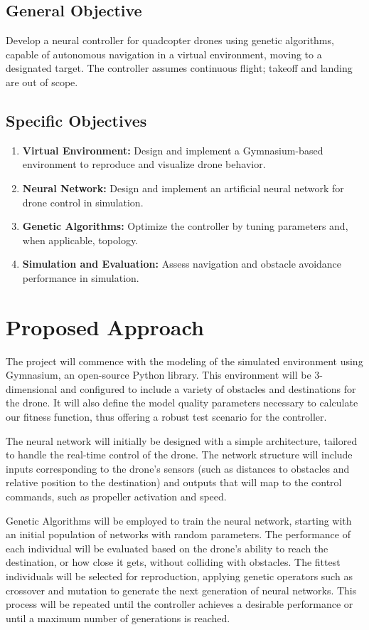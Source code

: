 \documentclass[12pt]{article}
\theoremstyle{definition}
\begin{document}
\subsection{General Objective}
Develop a neural controller for quadcopter drones using genetic algorithms, capable of autonomous navigation in a virtual environment, moving to a designated target. The controller assumes continuous flight; takeoff and landing are out of scope.

\subsection{Specific Objectives}
\begin{enumerate}
    \item \textbf{Virtual Environment:} Design and implement a Gymnasium-based environment to reproduce and visualize drone behavior.
    \item \textbf{Neural Network:} Design and implement an artificial neural network for drone control in simulation.
    \item \textbf{Genetic Algorithms:} Optimize the controller by tuning parameters and, when applicable, topology.
    \item \textbf{Simulation and Evaluation:} Assess navigation and obstacle avoidance performance in simulation.
\end{enumerate}

\section{Proposed Approach}
The project will commence with the modeling of the simulated environment using Gymnasium, an open-source Python library. This environment will be 3-dimensional and configured to include a variety of obstacles and destinations for the drone. It will also define the model quality parameters necessary to calculate our fitness function, thus offering a robust test scenario for the controller.

The neural network will initially be designed with a simple architecture, tailored to handle the real-time control of the drone. The network structure will include inputs corresponding to the drone's sensors (such as distances to obstacles and relative position to the destination) and outputs that will map to the control commands, such as propeller activation and speed.

Genetic Algorithms will be employed to train the neural network, starting with an initial population of networks with random parameters. The performance of each individual will be evaluated based on the drone's ability to reach the destination, or how close it gets, without colliding with obstacles. The fittest individuals will be selected for reproduction, applying genetic operators such as crossover and mutation to generate the next generation of neural networks. This process will be repeated until the controller achieves a desirable performance or until a maximum number of generations is reached.
\end{document}
